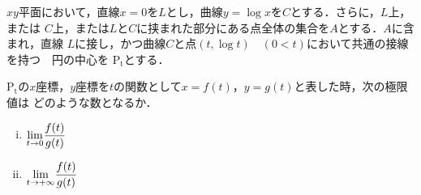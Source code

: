 \documentclass[a4j]{jarticle}
\begin{document}

\preEqlabel{$\cdots$}
     \begin{oframed}
     $xy$平面において，直線$x=0$を$L$とし，曲線$y=\log x$を$C$とする．さらに，$L$上，または
     $C$上，または$L$と$C$に挟まれた部分にある点全体の集合を$A$とする．$A$に含まれ，直線
     $L$に接し，かつ曲線$C$と点$(t,\log t)\quad (0<t)$において共通の接線を持つ　円の中心を
     $\mathrm{P_t}$とする．
     
     $\mathrm{P_t}$の$x$座標，$y$座標を$t$の関数として$x=f(t)$，$y=g(t)$と表した時，次の極限値は
     どのような数となるか．
          \begin{enumerate}[i)]
          \item ${\displaystyle \lim_{t\to0}}\dfrac{f(t)}{g(t)}$ \\
          \item ${\displaystyle \lim_{t\to+\infty}}\dfrac{f(t)}{g(t)}$
          \end{enumerate}
     \end{oframed}
\end{document}
